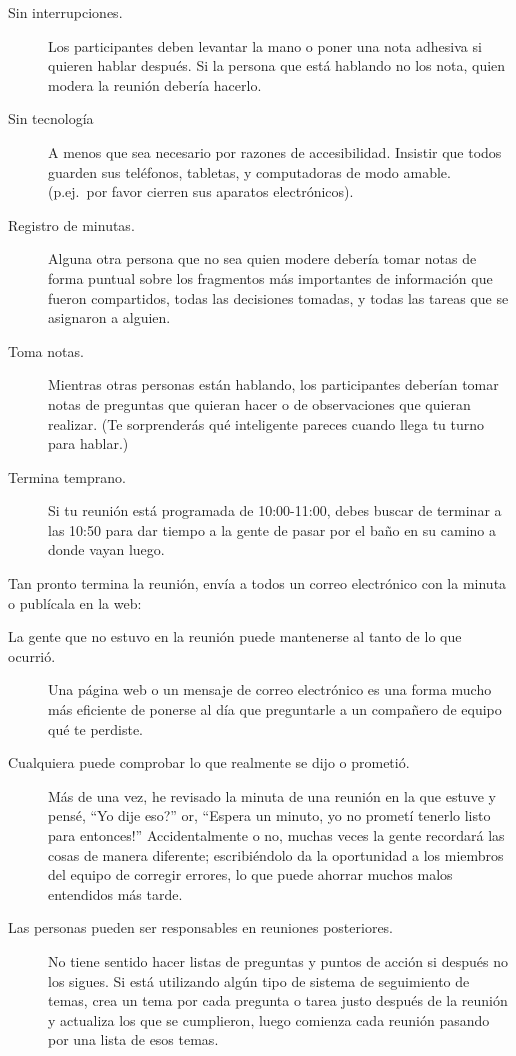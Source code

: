 \begin{description}
\item[Sin interrupciones.]
  Los participantes deben levantar la mano o poner una nota adhesiva
  si quieren hablar después.
  Si la persona que está hablando no los nota,
  quien modera la reunión debería hacerlo.

\item[Sin tecnología]
  A menos que sea necesario por razones de accesibilidad.
  Insistir que todos guarden sus teléfonos, tabletas, y computadoras de modo amable.
  (p.ej.\ por favor cierren sus aparatos electrónicos).

\item[Registro de minutas.]
  Alguna otra persona que no sea quien modere debería tomar notas de forma puntual sobre 
  los fragmentos más importantes de información que fueron compartidos,
  todas las decisiones tomadas,
  y todas las tareas que se asignaron a alguien.

\item[Toma notas.]
  Mientras otras personas están hablando,
  los participantes deberían tomar notas de preguntas que quieran hacer o de observaciones que quieran realizar.
  (Te sorprenderás qué inteligente pareces cuando llega tu turno para hablar.)

\item[Termina temprano.]
  Si tu reunión está programada de 10:00-11:00,
  debes buscar de terminar a las 10:50 para dar tiempo a la gente de pasar por el baño 
  en su camino a donde vayan luego.

\end{description}

Tan pronto termina la reunión,
envía a todos un correo electrónico con la minuta o publícala en la web:

\begin{description}

\item[La gente que no estuvo en la reunión puede mantenerse al tanto de lo que ocurrió.]
  Una página web o un mensaje de correo electrónico es una forma mucho más eficiente de ponerse al día
  que preguntarle a un compañero de equipo qué te perdiste.

\item[Cualquiera puede comprobar lo que realmente se dijo o prometió.]
  Más de una vez,
  he revisado la minuta de una reunión en la que estuve
  y pensé, ``Yo dije eso?''
  or, ``Espera un minuto, yo no prometí tenerlo listo para entonces!''
  Accidentalmente o no,
  muchas veces la gente recordará las cosas de manera diferente;
  escribiéndolo da la oportunidad a los miembros del equipo de corregir errores,
  lo que puede ahorrar muchos malos entendidos más tarde.

\item[Las personas pueden ser responsables en reuniones posteriores.]
  No tiene sentido hacer listas de preguntas y puntos de acción
  si después no los sigues.
  Si está utilizando algún tipo de sistema de seguimiento de temas,
  crea un tema por cada pregunta o tarea justo después de la reunión
  y actualiza los que se cumplieron,
  luego comienza cada reunión pasando por una lista de esos temas.

\end{description}

